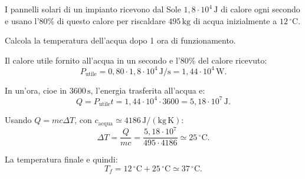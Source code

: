 
\begin{esercizio}
I pannelli solari di un impianto ricevono dal Sole
\(1{,}8 \cdot 10^4\,\mathrm{J}\) di calore ogni secondo e usano l'80\% di
questo calore per riscaldare \(495\,\mathrm{kg}\) di acqua inizialmente a
\(12\,^\circ\mathrm{C}\).

Calcola la temperatura dell'acqua dopo 1 ora di funzionamento.
\end{esercizio}

\begin{soluzione}
Il calore utile fornito all'acqua in un secondo e l'80\% del calore ricevuto:
\[
P_\text{utile}=0{,}80\cdot 1{,}8\cdot 10^4\,\mathrm{J/s}
=1{,}44\cdot 10^4\,\mathrm{W}.
\]

In un'ora, cioe in \(3600\,\mathrm{s}\), l'energia trasferita all'acqua e:
\[
Q=P_\text{utile}t
=1{,}44\cdot 10^4\cdot 3600
=5{,}18\cdot 10^7\,\mathrm{J}.
\]

Usando \(Q=mc\Delta T\), con
\(c_\text{acqua}\simeq 4186\,\mathrm{J/(kg\,K)}\):
\[
\Delta T=\frac{Q}{mc}
=\frac{5{,}18\cdot 10^7}{495\cdot 4186}
\simeq 25\,^\circ\mathrm{C}.
\]

La temperatura finale e quindi:
\[
T_f=12\,^\circ\mathrm{C}+25\,^\circ\mathrm{C}
\simeq 37\,^\circ\mathrm{C}.
\]
\end{soluzione}
